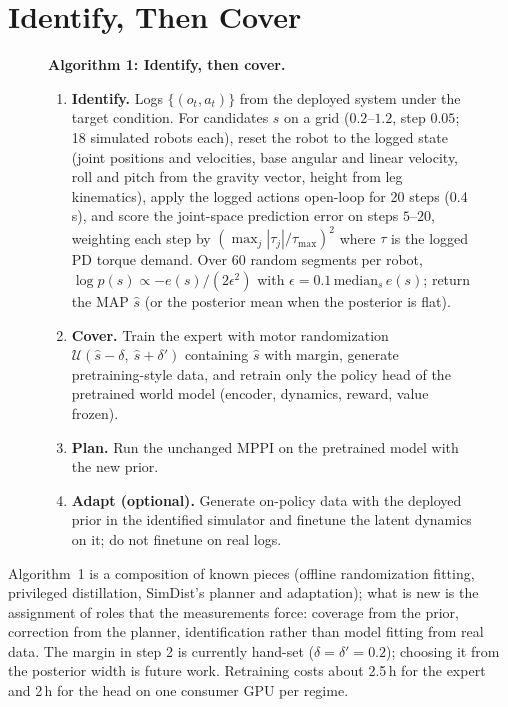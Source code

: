 \documentclass[conference]{IEEEtran}
\begin{document}
\section{Identify, Then Cover}\label{sec:method}
\begin{figure}[t]
\begin{small}
\noindent\textbf{Algorithm 1: Identify, then cover.}\label{alg:itc}
\begin{enumerate}
\item \textbf{Identify.} Logs $\{(o_t,a_t)\}$ from the deployed system under the target condition. For candidates $s$ on a grid ($0.2$--$1.2$, step $0.05$; 18 simulated robots each), reset the robot to the logged state (joint positions and velocities, base angular and linear velocity, roll and pitch from the gravity vector, height from leg kinematics), apply the logged actions open-loop for 20 steps (0.4\,s), and score the joint-space prediction error on steps $5$--$20$, weighting each step by $(\max_j|\tau_j|/\tau_{\max})^2$ where $\tau$ is the logged PD torque demand. Over 60 random segments per robot, $\log p(s)\propto -e(s)/(2\epsilon^2)$ with $\epsilon=0.1\,\mathrm{median}_s\,e(s)$; return the MAP $\hat s$ (or the posterior mean when the posterior is flat).
\item \textbf{Cover.} Train the expert with motor randomization $\mathcal{U}(\hat s-\delta,\ \hat s+\delta')$ containing $\hat s$ with margin, generate pretraining-style data, and retrain only the policy head of the pretrained world model (encoder, dynamics, reward, value frozen).
\item \textbf{Plan.} Run the unchanged MPPI on the pretrained model with the new prior.
\item \textbf{Adapt (optional).} Generate on-policy data with the deployed prior in the identified simulator and finetune the latent dynamics on it; do not finetune on real logs.
\end{enumerate}
\end{small}
\end{figure}
Algorithm~1 is a composition of known pieces (offline randomization fitting, privileged distillation, SimDist's planner and adaptation); what is new is the assignment of roles that the measurements force: coverage from the prior, correction from the planner, identification rather than model fitting from real data. The margin in step 2 is currently hand-set ($\delta=\delta'=0.2$); choosing it from the posterior width is future work. Retraining costs about 2.5\,h for the expert and 2\,h for the head on one consumer GPU per regime.
\end{document}
